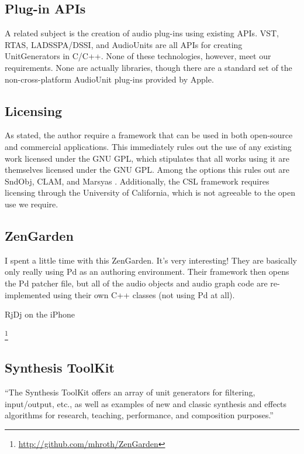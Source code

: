 \documentclass[twoside,10pt]{article}
\begin{document}


\subsection{Plug-in APIs}

A related subject is the creation of audio plug-ins using existing APIs.  VST, RTAS, LADSSPA/DSSI, and AudioUnits are all APIs for creating UnitGenerators in C/C++.  None of these technologies, however, meet our requirements.  None are actually libraries, though there are a standard set of the non-cross-platform AudioUnit plug-ins provided by Apple.


\subsection{Licensing}

As stated, the author require a framework that can be used in both open-source and commercial applications.  This immediately rules out the use of any existing work licensed under the GNU GPL, which stipulates that all works using it are themselves licensed under the GNU GPL.  Among the options this rules out are SndObj\cite{Lazzarini:2001}, CLAM\cite{Amatraian:2008}, and Marsyas \cite{Tzanetakis:2008}.  Additionally, the CSL framework\cite{Pope:2003} requires licensing through the University of California, which is not agreeable to the open use we require.


\subsection{ZenGarden} %

I spent a little time with this ZenGarden.  It's very interesting!
They are basically only really using Pd as an authoring environment.
Their framework then opens the Pd patcher file, but all of the audio
objects and audio graph code are re-implemented using their own C++
classes (not using Pd at all).

RjDj on the iPhone

\footnote{\url{http://github.com/mhroth/ZenGarden}}



\subsection{Synthesis ToolKit} %

``The Synthesis ToolKit offers an array of unit generators for filtering, input/output, etc., as well as examples of new and classic synthesis and effects algorithms for research, teaching, performance, and composition purposes.''\cite{Cook:1999}
\end{document}
